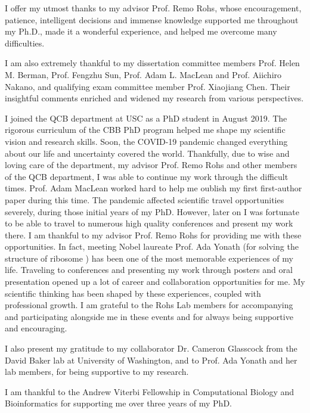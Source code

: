 
I offer my utmost thanks to my advisor Prof. Remo Rohs, whose encouragement, patience, intelligent decisions and immense knowledge supported me throughout my Ph.D., made it a wonderful experience, and helped me overcome many difficulties.

I am also extremely thankful to my dissertation committee members Prof. Helen M. Berman, Prof. Fengzhu Sun, Prof. Adam L. MacLean and Prof. Aiichiro Nakano, and qualifying exam committee member Prof. Xiaojiang Chen. Their insightful comments enriched and widened my research from various perspectives. 

I joined the QCB department at USC as a PhD student in August 2019. The rigorous curriculum of the CBB PhD program helped me shape my scientific vision and research skills. Soon, the COVID-19 pandemic changed everything about our life and uncertainty covered the world. Thankfully, due to wise and loving care of the department, my advisor Prof. Remo Rohs and other members of the QCB department, I was able to continue my work through the difficult times. Prof. Adam MacLean worked hard to help me oublish my first first-author paper during this time. The pandemic affected scientific travel opportunities severely, during those initial years of my PhD. However, later on I was fortunate to be able to travel to numerous high quality conferences and present my work there. I am thankful to my advisor Prof. Remo Rohs for providing me with these opportunities. In fact, meeting Nobel laureate Prof. Ada Yonath (for solving the structure of ribosome \citep{schluenzen2000structure, harms2001high}) has been one of the most memorable experiences of my life. Traveling to conferences and presenting my work through posters and oral presentation opened up a lot of career and collaboration opportunities for me. My scientific thinking has been shaped by these experiences, coupled with professional growth. I am grateful to the Rohs Lab members for accompanying and participating alongside me in these events and for always being supportive and encouraging.

I also present my gratitude to my collaborator Dr. Cameron Glasscock from the David Baker lab at University of Washington, and to Prof. Ada Yonath and her lab members, for being supportive to my research. 

I am thankful to the Andrew Viterbi Fellowship in Computational Biology and Bioinformatics for supporting me over three years of my PhD.

